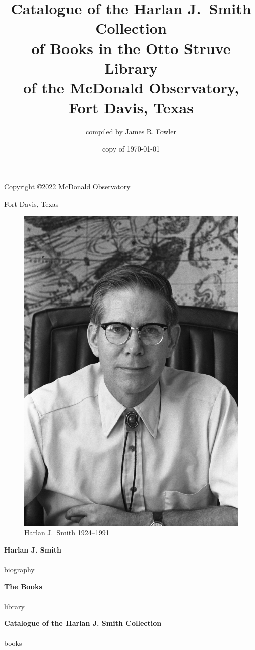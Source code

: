 \documentclass[letterpaper]{book}
\begin{document}
\frontmatter
\pagestyle{empty}
\title{Catalogue of the Harlan J.~Smith Collection \\
  of Books in the Otto Struve Library \\
  of the McDonald Observatory, \\
  Fort Davis, Texas}
\author{compiled by James R. Fowler}
\date{copy of \today}
\maketitle
\clearpage

\vspace*{5 in}
\centerline{Copyright \copyright 2022 McDonald Observatory}
\centerline{Fort Davis, Texas}
\clearpage

\pagestyle{plain}
\begin{figure}[t]
  \centering
  \includegraphics{hjs_photo.jpg}
  Harlan J.~Smith 1924--1991
  \label{fig:hjs}
\end{figure}
\clearpage

{\Large \bf Harlan J. Smith}
\\
\\
{biography}
\clearpage

{\Large \bf The Books}
\\
\\
{library}
\clearpage

\printbibliography

\mainmatter
{\Large \bf Catalogue of the Harlan J. Smith Collection}
\\
\\
{books}
\end{document}
